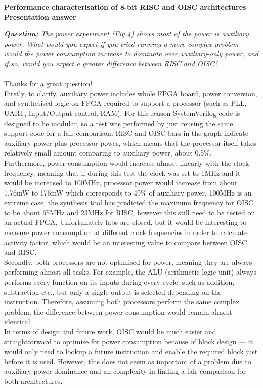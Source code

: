 \documentclass[a4paper,12pt]{article}
\begin{document}
	\begin{titlepage}
	\begin{center}
	{ \Large \bfseries Performance characterisation of 8-bit RISC and OISC architectures}\\[0.2cm]
	\large\bfseries Presentation answer
	\end{center}
	\textit{\textbf{Question:} The power experiment (Fig 4) shows most of the power is auxiliary power. What would you expect if you tried running a more complex problem - would the power consumption increase to dominate over auxiliary-only power, and if so, would you expect a greater difference between RISC and OISC?}
	\\\\
	Thanks for a great question!
	\\
	
	Firstly, to clarify, auxiliary power includes whole FPGA board, power conversion, and synthesised logic on FPGA required to support a processor (such as PLL, UART, Input/Output control, RAM). For this reason SystemVerilog code is designed to be modular, so a test was performed by just reusing the same support code for a fair comparison.
	RISC and OISC bars in the graph indicate auxiliary power plus processor power, which means that the processor itself takes relatively small amount comparing to auxiliary power, about 0.5\%.
	\\
	
	Furthermore, power consumption would increase almost linearly with the clock frequency, meaning that if during this test the clock was set to 1MHz and it would be increased to 100MHz, processor power would increase from about 1.76mW to 176mW which corresponds to 49\% of auxiliary power. 100MHz is an extreme case, the synthesis tool has predicted the maximum frequency for OISC to be about 65MHz and 23MHz for RISC, however this still need to be tested on an actual FPGA. Unfortunately labs are closed, but it would be interesting to measure power consumption at different clock frequencies in order to calculate activity factor, which would be an interesting value to compare between OISC and RISC.
	\\
	  
	Secondly, both processors are not optimised for power, meaning they are always performing almost all tasks. For example, the ALU (arithmetic logic unit) always performs every function on its inputs during every cycle, such as addition, subtraction etc., but only a single output is selected depending on the instruction. Therefore, assuming both processors perform the same complex problem, the difference between power consumption would remain almost identical.
	\\
	
	In terms of design and future work, OISC would be much easier and straightforward to optimise for power consumption because of block design — it would only need to lookup a future instruction and enable the required block just before it is used. However, this does not seem as important of a problem due to auxiliary power dominance and an complexity in finding a fair comparison for both architectures.  

	\end{titlepage}
\end{document}
